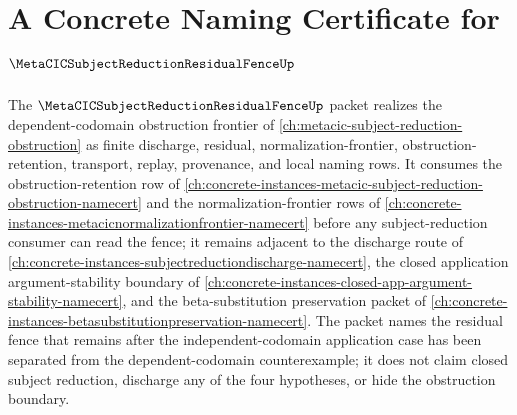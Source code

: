 \chapter{A Concrete Naming Certificate for $\MetaCICSubjectReductionResidualFenceUp$}
\label{ch:concrete-instances-metacic-subject-reduction-residual-fence-namecert}

The $\MetaCICSubjectReductionResidualFenceUp$ packet realizes the dependent-codomain obstruction frontier of \autoref{ch:metacic-subject-reduction-obstruction} as finite discharge, residual, normalization-frontier, obstruction-retention, transport, replay, provenance, and local naming rows. It consumes the obstruction-retention row of \autoref{ch:concrete-instances-metacic-subject-reduction-obstruction-namecert} and the normalization-frontier rows of \autoref{ch:concrete-instances-metacicnormalizationfrontier-namecert} before any subject-reduction consumer can read the fence; it remains adjacent to the discharge route of \autoref{ch:concrete-instances-subjectreductiondischarge-namecert}, the closed application argument-stability boundary of \autoref{ch:concrete-instances-closed-app-argument-stability-namecert}, and the beta-substitution preservation packet of \autoref{ch:concrete-instances-betasubstitutionpreservation-namecert}. The packet names the residual fence that remains after the independent-codomain application case has been separated from the dependent-codomain counterexample; it does not claim closed subject reduction, discharge any of the four hypotheses, or hide the obstruction boundary.

